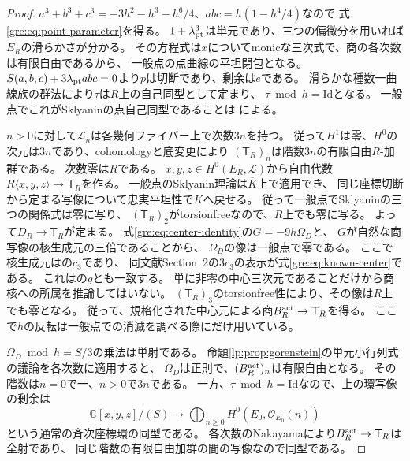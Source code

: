 \begin{proof}
$a^3+b^3+c^3=-3h^2-h^3-h^6/4$、$abc=h(1-h^4/4)$なので
式\eqref{gre:eq:point-parameter}を得る。
$1+\lambda_{\rm pt}^3$は単元であり、三つの偏微分を用いれば$E_R$の滑らかさが分かる。
その方程式は$x$についてmonicな三次式で、商の各次数は有限自由であるから、
一般点の点曲線の平坦閉包となる。
$S(a,b,c)+3\lambda_{\rm pt}abc=0$より$p$は切断であり、剰余は$e$である。
滑らかな種数一曲線族の群法により$\tau$は$R$上の自己同型として定まり、
$\tau\bmod h=\mathrm{Id}$となる。
一般点でこれがSklyaninの点自己同型であることは
\cite[Section~1, pp.~37--38]{GRSklyaninATV}による。

$n>0$に対して$\mathcal L_n$は各幾何ファイバー上で次数$3n$を持つ。
従って$H^1$は零、$H^0$の次元は$3n$であり、cohomologyと底変更により
$(\mathsf T_R)_n$は階数$3n$の有限自由$R$-加群である。
次数零は$R$である。
$x,y,z\in H^0(E_R,\mathcal L)$から自由代数$R\langle x,y,z\rangle\to\mathsf T_R$を作る。
一般点のSklyanin理論は$\overline K$上で適用でき、
同じ座標切断から定まる写像について忠実平坦性で$K$へ戻せる。
従って一般点でSklyaninの三つの関係式は零に写り、
$(\mathsf T_R)_2$がtorsionfreeなので、$R$上でも零に写る。
よって$D_R\to\mathsf T_R$が定まる。
式\eqref{gre:eq:center-identity}の$G=-9h\Omega_D$と、
$G$が自然な商写像の核生成元の三倍であることから、
$\Omega_D$の像は一般点で零である。
ここで核生成元は\cite[Sections~1--2, pp.~1, 3]{GRSklyaninDLL}の$c_3$であり、
同文献Section~2の$3c_3$の表示が式\eqref{gre:eq:known-center}である。
これは\cite[pp.~20, 35, Remark~(1)]{GRSklyaninST}の$g$とも一致する。
単に非零の中心三次元であることだけから商核への所属を推論してはいない。
$(\mathsf T_R)_3$のtorsionfree性により、その像は$R$上でも零となる。
従って、規格化された中心元による商$B_R^{\rm act}\to\mathsf T_R$を得る。
ここで$h$の反転は一般点での消滅を調べる際にだけ用いている。

$\Omega_D\bmod h=S/3$の乗法は単射である。
命題\ref{lp:prop:gorenstein}の単元小行列式の議論を各次数に適用すると、
$\Omega_D$は正則で、$(B_R^{\rm act})_n$は有限自由となる。
その階数は$n=0$で一、$n>0$で$3n$である。
一方、$\tau\bmod h=\mathrm{Id}$なので、上の環写像の剰余は
\[
 \mathbb C[x,y,z]/(S)\longrightarrow
 \bigoplus_{n\ge0}H^0(E_0,\mathcal O_{E_0}(n))
\]
という通常の斉次座標環の同型である。
各次数のNakayamaにより$B_R^{\rm act}\to\mathsf T_R$は全射であり、
同じ階数の有限自由加群の間の写像なので同型である。


\end{proof}
